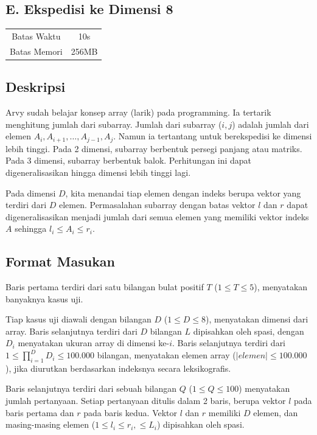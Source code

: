 \documentclass{article}
\begin{document}
\begin{center}
    \section*{E. Ekspedisi ke Dimensi 8} %

    \begin{tabular}{ | c c | }
        \hline
        Batas Waktu  & 10s \\ 
        Batas Memori & 256MB \\
        \hline
    \end{tabular}
\end{center}

\subsection*{Deskripsi}

Arvy sudah belajar konsep array (larik) pada programming.
Ia tertarik menghitung jumlah dari subarray.
Jumlah dari subarray ($i, j$) adalah jumlah dari elemen $A_i, A_{i+1}, \dots, A_{j-1}, A_j$.
Namun ia tertantang untuk berekspedisi ke dimensi lebih tinggi.
Pada 2 dimensi, subarray berbentuk persegi panjang atau matriks.
Pada 3 dimensi, subarray berbentuk balok.
Perhitungan ini dapat digeneralisasikan hingga dimensi lebih tinggi lagi.

Pada dimensi $D$, kita menandai tiap elemen dengan indeks berupa vektor yang terdiri dari $D$ elemen.
Permasalahan subarray dengan batas vektor $l$ dan $r$ dapat digeneralisasikan menjadi jumlah dari semua elemen yang memiliki vektor indeks $A$ sehingga $l_i \leq A_i \leq r_i$.

\subsection*{Format Masukan}

Baris pertama terdiri dari satu bilangan bulat positif $T$ ($1 \leq T \leq 5$), menyatakan banyaknya kasus uji.

Tiap kasus uji diawali dengan bilangan $D$ ($1 \leq D \leq 8$), menyatakan dimensi dari array.
Baris selanjutnya terdiri dari $D$ bilangan $L$ dipisahkan oleh spasi, dengan $D_i$ menyatakan ukuran array di dimensi ke-$i$.
Baris selanjutnya terdiri dari $1 \leq \prod_{i=1}^{D}{D_i} \leq 100.000$ bilangan, menyatakan elemen array ($|elemen| \leq 100.000$), jika diurutkan berdasarkan indeksnya secara leksikografis.

Baris selanjutnya terdiri dari sebuah bilangan $Q$ ($1 \leq Q \leq 100$) menyatakan jumlah pertanyaan.
Setiap pertanyaan ditulis dalam 2 baris, berupa vektor $l$ pada baris pertama dan $r$ pada baris kedua. Vektor $l$ dan $r$ memiliki $D$ elemen, dan masing-masing elemen ($1 \leq l_i \leq r_i, \leq L_i$) dipisahkan oleh spasi.
\end{document}
